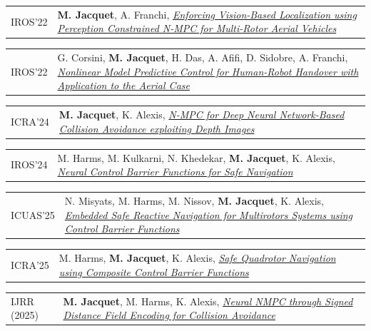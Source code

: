 \documentclass[10pt]{article}
\newlength{\annee}
\newlength{\texte}
\begin{document}
\begin{tabular}{@{}p{\annee}p{\texte}@{}}
	\small
	IROS'22				& {\bf M. Jacquet}, A. Franchi, \href{https://doi.org/10.1109/IROS47612.2022.9981643}{\it Enforcing Vision-Based Localization using Perception Constrained N-MPC for Multi-Rotor Aerial Vehicles}
\end{tabular} \par
\begin{tabular}{@{}p{\annee}p{\texte}@{}}
	\small
	IROS'22				& G. Corsini, {\bf M. Jacquet}, H. Das, A. Afifi, D. Sidobre, A. Franchi, \href{https://doi.org/10.1109/IROS47612.2022.9981045}{\it Nonlinear Model Predictive Control for Human-Robot Handover with Application to the Aerial Case}
\end{tabular} \par
\begin{tabular}{@{}p{\annee}p{\texte}@{}}
	\small
	ICRA'24				& {\bf M. Jacquet}, K. Alexis, \href{https://doi.org/10.1109/ICRA57147.2024.10610572}{\it N-MPC for Deep Neural Network-Based Collision Avoidance exploiting Depth Images}
\end{tabular} \par
\begin{tabular}{@{}p{\annee}p{\texte}@{}}
	\small
	IROS'24				& M. Harms, M. Kulkarni, N. Khedekar, {\bf M. Jacquet}, K. Alexis, \href{https://doi.org/10.1109/IROS58592.2024.10802694}{\it Neural Control Barrier Functions for Safe Navigation}
\end{tabular} \par
\begin{tabular}{@{}p{\annee}p{\texte}@{}}
	\small
	ICUAS'25			& N. Misyats, M. Harms, M. Nissov, {\bf M. Jacquet}, K. Alexis, \href{https://doi.org/10.1109/ICUAS65942.2025.11007827}{\it Embedded Safe Reactive Navigation for Multirotors Systems using Control Barrier Functions}
\end{tabular} \par
\begin{tabular}{@{}p{\annee}p{\texte}@{}}
	\small
	ICRA'25				& M. Harms, {\bf M. Jacquet}, K. Alexis, \href{https://doi.org/10.1109/ICRA55743.2025.11127368}{\it Safe Quadrotor Navigation using Composite Control Barrier Functions}
\end{tabular} \par
\begin{tabular}{@{}p{\annee}p{\texte}@{}}
	\small
	IJRR (2025)			& {\bf M. Jacquet}, M. Harms, K. Alexis, \href{https://doi.org/10.1177/02783649251401223}{\it Neural NMPC through Signed Distance Field Encoding for Collision Avoidance}
\end{tabular} \par
\end{document}

